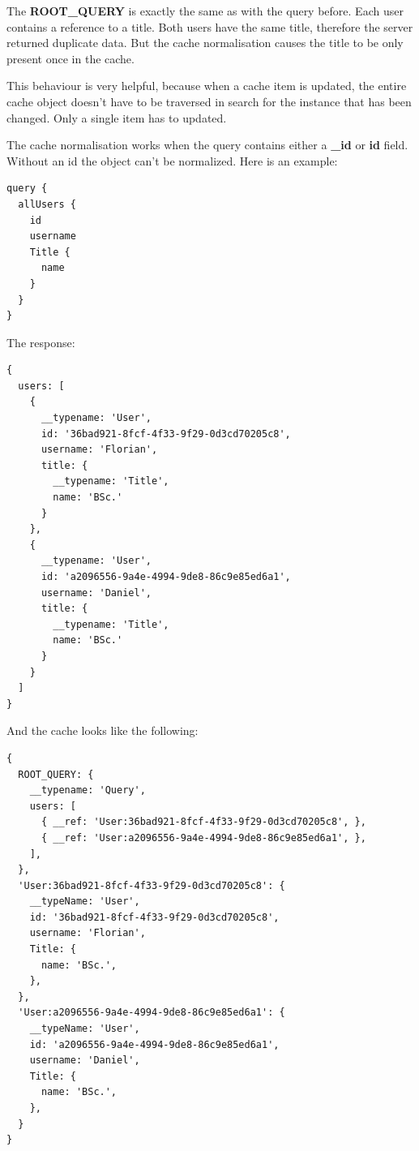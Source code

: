 The \textbf{ROOT\_QUERY} is exactly the same as with the query before. Each user contains a reference to a title. Both users have the same title, therefore the server returned duplicate data. But the cache normalisation causes the title to be only present once in the cache.

This behaviour is very helpful, because when a cache item is updated, the entire cache object doesn't have to be traversed in search for the instance that has been changed. Only a single item has to updated.

The cache normalisation works when the query contains either a \textbf{\_id} or \textbf{id} field. Without an id the object can't be normalized. Here is an example:

\ifshowListings
\begin{listing}[H]
\begin{verbatim}
query {
  allUsers {
    id
    username
    Title {
      name
    }
  }
}
\end{verbatim}
\caption{An example of a query}\label{code:background:no-id-query-user-cache}
\end{listing}
\fi

The response: 

\ifshowListings
\begin{listing}[H]
\begin{verbatim}
{
  users: [
    {
      __typename: 'User',
      id: '36bad921-8fcf-4f33-9f29-0d3cd70205c8',
      username: 'Florian',
      title: {
        __typename: 'Title',
        name: 'BSc.'
      }
    }, 
    {
      __typename: 'User',
      id: 'a2096556-9a4e-4994-9de8-86c9e85ed6a1',
      username: 'Daniel',
      title: {
        __typename: 'Title',
        name: 'BSc.'
      }
    }
  ]
}
\end{verbatim}
\caption{The result of the GraphQL query from listing \ref{code:background:no-id-query-user-cache}}\label{code:background:no-id-query-user-response-result}
\end{listing}
\fi

And the cache looks like the following:

\ifshowListings
\begin{listing}[H]
\begin{verbatim}
{
  ROOT_QUERY: {
    __typename: 'Query',
    users: [
      { __ref: 'User:36bad921-8fcf-4f33-9f29-0d3cd70205c8', },
      { __ref: 'User:a2096556-9a4e-4994-9de8-86c9e85ed6a1', },
    ],
  },
  'User:36bad921-8fcf-4f33-9f29-0d3cd70205c8': {
    __typeName: 'User',
    id: '36bad921-8fcf-4f33-9f29-0d3cd70205c8',
    username: 'Florian',
    Title: {
      name: 'BSc.',
    },
  },
  'User:a2096556-9a4e-4994-9de8-86c9e85ed6a1': {
    __typeName: 'User',
    id: 'a2096556-9a4e-4994-9de8-86c9e85ed6a1',
    username: 'Daniel',
    Title: {
      name: 'BSc.',
    },
  }
}
\end{verbatim}
\caption{The data inside the cache with the response from listing \ref{code:background:no-id-query-user-response-result}}\label{code:background:no-id-query-user-cache-representation}
\end{listing}
\fi

